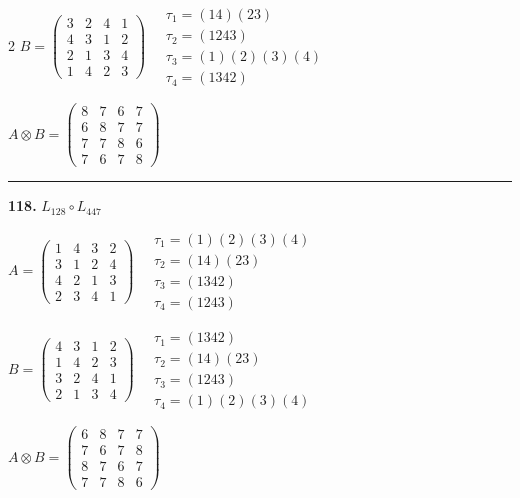 \begin{multicols}{2}
$B = \begin{pmatrix} 3 & 2 & 4 & 1 \\ 4 & 3 & 1 & 2 \\ 2 & 1 & 3 & 4 \\ 1 & 4 & 2 & 3 \end{pmatrix} \quad \begin{matrix} \tau_{1}=(1 4)(2 3) \\ \tau_{2}=(1 2 4 3) \\ \tau_{3}=(1)(2)(3)(4) \\ \tau_{4}=(1 3 4 2) \end{matrix}$

$A \otimes B = \begin{pmatrix} 8 & 7 & 6 & 7 \\ 6 & 8 & 7 & 7 \\ 7 & 7 & 8 & 6 \\ 7 & 6 & 7 & 8 \end{pmatrix}$

\vspace{0.3em}
\hrule
\vspace{0.3em}

\noindent\textbf{118.} $L_{128} \circ L_{447}$

$A = \begin{pmatrix} 1 & 4 & 3 & 2 \\ 3 & 1 & 2 & 4 \\ 4 & 2 & 1 & 3 \\ 2 & 3 & 4 & 1 \end{pmatrix} \quad \begin{matrix} \tau_{1}=(1)(2)(3)(4) \\ \tau_{2}=(1 4)(2 3) \\ \tau_{3}=(1 3 4 2) \\ \tau_{4}=(1 2 4 3) \end{matrix}$

$B = \begin{pmatrix} 4 & 3 & 1 & 2 \\ 1 & 4 & 2 & 3 \\ 3 & 2 & 4 & 1 \\ 2 & 1 & 3 & 4 \end{pmatrix} \quad \begin{matrix} \tau_{1}=(1 3 4 2) \\ \tau_{2}=(1 4)(2 3) \\ \tau_{3}=(1 2 4 3) \\ \tau_{4}=(1)(2)(3)(4) \end{matrix}$

$A \otimes B = \begin{pmatrix} 6 & 8 & 7 & 7 \\ 7 & 6 & 7 & 8 \\ 8 & 7 & 6 & 7 \\ 7 & 7 & 8 & 6 \end{pmatrix}$


\end{multicols}
